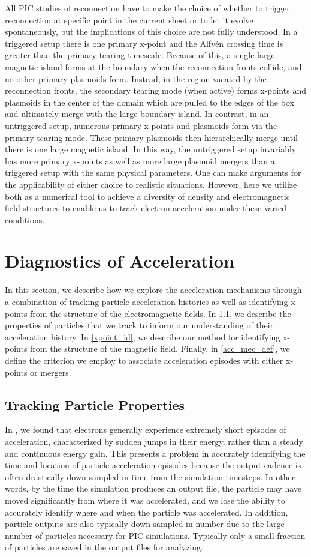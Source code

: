 \documentclass[iop,twocolappendix]{emulateapj}
\begin{document}
All PIC studies of reconnection have to make the choice of whether to trigger reconnection at specific point in the current sheet or to let it evolve spontaneously, but the implications of this choice are not fully understood.  In a triggered setup there is one primary x-point and the Alfv\'en crossing time is greater than the primary tearing timescale.  Because of this, a single large magnetic island forms at the boundary when the reconnection fronts collide, and no other primary plasmoids form.  Instead, in the region vacated by the reconnection fronts, the secondary tearing mode (when active) forms x-points and plasmoids in the center of the domain which are pulled to the edges of the box and ultimately merge with the large boundary island.  In contrast, in an untriggered setup, numerous primary x-points and plasmoids form via the primary tearing mode.  These primary plasmoids then hierarchically merge until there is one large magnetic island.  In this way, the untriggered setup invariably has more primary x-points as well as more large plasmoid mergers than a triggered setup with the same physical parameters.  One can make arguments for the applicability of either choice to realistic situations.  However, here we utilize both as a numerical tool to achieve a diversity of density and electromagnetic field structures to enable us to track electron acceleration under these varied conditions.


\section{Diagnostics of Acceleration}
In this section, we describe how we explore the acceleration mechanisms through a combination of tracking particle acceleration histories as well as identifying x-points from the structure of the electromagnetic fields.  In \ref{diagnostics}, we describe the properties of particles that we track to inform our understanding of their acceleration history.  In \ref{xpoint_id}, we describe our method for identifying x-points from the structure of the magnetic field.  Finally, in \ref{acc_mec_def}, we define the criterion we employ to associate acceleration episodes with either x-points or mergers.
\subsection{Tracking Particle Properties} \label{diagnostics}
In \citet{ball2018}, we found that electrons generally experience extremely short episodes of acceleration, characterized by sudden jumps in their energy, rather than a steady and continuous energy gain.  This presents a problem in accurately identifying the time and location of particle acceleration episodes because the output cadence is often drastically down-sampled in time from the simulation timesteps.  In other words, by the time the simulation produces an output file, the particle may have moved significantly from where it was accelerated, and we lose the ability to accurately identify where and when the particle was accelerated.  In addition, particle outputs are also typically down-sampled in number due to the large number of particles necessary for PIC simulations.  Typically only a small fraction of particles are saved in the output files for analyzing. 
\end{document}

